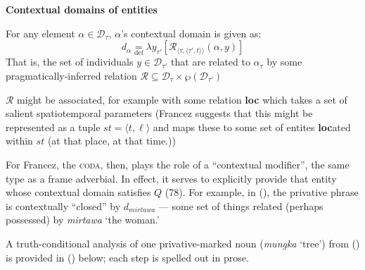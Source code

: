 \pex \textbf{Contextual domains of entities} \citep[from][71]{Francez2007}

For any element $ \alpha\in\mathcal D_\tau$, $ \alpha $'s contextual domain is given as:
$$ d_\alpha\underset{\text{def}}{=} \lambda y_{\tau'}[\mathcal R_{\langle\tau,\langle\tau',t\rangle\rangle}(\alpha,y)]$$
That is, the set of individuals $ y\in\mathcal D_{\tau'} $ that are related to $ \alpha_\tau $ by some pragmatically-inferred relation $ \mathcal R\subseteq \mathcal{D_\tau\times\wp{(D_{\tau'})}} $

\xe

\noindent $ \mathcal R $ might be associated, for example with some relation \textbf{loc} which takes a set of salient spatiotemporal parameters (Francez suggests that this might be represented as a tuple $ st=\langle t,\ell\rangle $ and maps these to some set of entites \textbf{loc}ated within $ st $ (at that place, at that time.))

For Francez, the \textsc{coda}, then, plays the role of a ``contextual modifier'', the same type as a frame adverbial. In effect, it serves to explicitly provide that entity whose contextual domain satisfies $ Q $ (78). For example, in (), the privative phrase is contextually ``closed'' by $ d_{\textit{mirtawa}} $ --- some set of things related (perhaps possessed) by \textit{mirtawa} `the woman.'


A truth-conditional analysis of one privative-marked noun (\textit{mungka} `tree') from () is provided in () below; each step is spelled out in prose.

